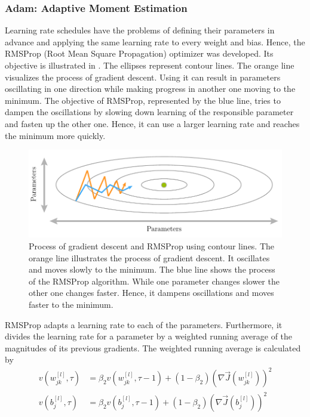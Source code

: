\subsubsection{Adam: Adaptive Moment Estimation}
\label{sec:training-adam}
Learning rate schedules have the problems of defining their parameters in advance and applying the same learning rate to every weight and bias.
Hence, the RMSProp (Root Mean Square Propagation) optimizer was developed\cite{Tieleman2012}.
Its objective is illustrated in .
The ellipses represent contour lines.
The orange line visualizes the process of gradient descent.
Using it can result in parameters oscillating in one direction while making progress in another one moving to the minimum.
The objective of RMSProp, represented by the blue line, tries to dampen the oscillations by slowing down learning of the responsible parameter and fasten up the other one.
Hence, it can use a larger learning rate and reaches the minimum more quickly.
\begin{figure}
	\centering
	\includegraphics[]{images/rmsprop.pdf}
	\caption[Process of Gradient Descent and RMSProp]{Process of gradient descent and RMSProp using contour lines. The orange line illustrates the process of gradient descent. It oscillates and moves slowly to the minimum. The blue line shows the process of the RMSProp algorithm. While one parameter changes slower the other one changes faster. Hence, it dampens oscillations and moves faster to the minimum.}
	\label{fig:rmsprop}
\end{figure}
RMSProp adapts a learning rate to each of the parameters.
Furthermore, it divides the learning rate for a parameter by a weighted running average of the magnitudes of its previous gradients.
The weighted running average is calculated by
\begin{subequations}
	\label{eq:adam-second-momentum}
	\begin{align}
		v(w^{[l]}_{jk}, \tau) &= \beta_2 v(w^{[l]}_{jk}, \tau - 1) + (1-\beta_2) (\nabla \vec{J}(w^{[l]}_{jk}))^2 \\
		v(b^{[l]}_{j}, \tau) &= \beta_2 v(b^{[l]}_{j}, \tau - 1) + (1-\beta_2) (\nabla \vec{J}(b^{[l]}_{j}))^2
	\end{align}
\end{subequations}
